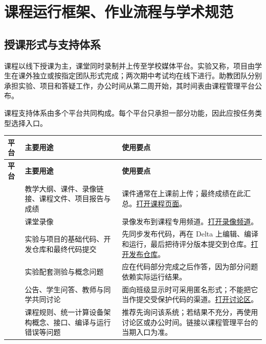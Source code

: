 \section{课程运行框架、作业流程与学术规范}

\subsection{授课形式与支持体系}

课程以线下授课为主，课堂同时录制并上传至学校媒体平台。实验又称，项目由学生在课外独立或按指定团队形式完成；两次期中考试均在线下进行。助教团队分别承担实验、项目和答疑工作，办公时间从第二周开始，其时间表由课程管理平台公布。

课程支持体系由多个平台共同构成。每个平台只承担一部分功能，因此应按任务类型选择入口。

\begin{longtable}{L{0.22\textwidth}L{0.28\textwidth}L{0.40\textwidth}}
\toprule
\textbf{平台} & \textbf{主要用途} & \textbf{使用要点} \\
\midrule
\endfirsthead
\toprule
\textbf{平台} & \textbf{主要用途} & \textbf{使用要点} \\
\midrule
\endhead
{} & 教学大纲、课件、录像链接、课程文件、项目报告与成绩 & 课件通常在上课前上传；最终成绩在此汇总。\href{https://canvas.illinois.edu/courses/72848}{打开课程页面}。 \\
 & 课堂录像 & 录像发布到课程专用频道。\href{https://mediaspace.illinois.edu/channel/channelid/413726632}{打开录像频道}。 \\
 & 实验与项目的基础代码、开发仓库和最终代码提交 & 先同步发布代码，再在 Delta 上编辑、编译和运行，最后把待评分版本提交到仓库。\href{https://github.com/illinois-cs-coursework/fa26_ece408_.release}{打开发布仓库}。 \\
 & 实验配套测验与概念问题 & 应在代码部分完成之后作答，因为部分问题依赖实际运行结果。 \\
 & 公告、学生问答、教师与同学共同讨论 & 面向班级显示时可采用匿名形式；不能把它当作提交受保护代码的渠道。\href{https://campuswire.com/c/GDA51582C/feed}{打开讨论区}。 \\
 & 课程规则、统一计算设备架构概念、接口、编译与运行错误等问题 & 推荐先询问该系统；若结果不充分，再使用讨论区或办公时间。链接以课程管理平台的当期入口为准。 \\
\bottomrule
\end{longtable}

